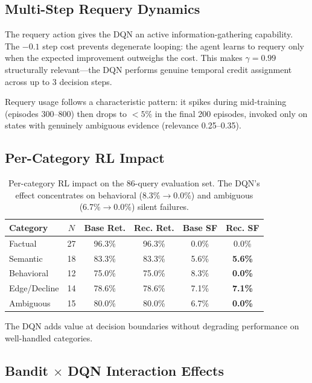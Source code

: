 \documentclass[11pt,letterpaper]{article}
\begin{document}
\subsection{Multi-Step Requery Dynamics}

The requery action gives the DQN an active information-gathering capability. The $-0.1$ step cost prevents degenerate looping: the agent learns to requery only when the expected improvement outweighs the cost. This makes $\gamma = 0.99$ structurally relevant---the DQN performs genuine temporal credit assignment across up to 3 decision steps.

Requery usage follows a characteristic pattern: it spikes during mid-training (episodes 300--800) then drops to $<5\%$ in the final 200 episodes, invoked only on states with genuinely ambiguous evidence (relevance 0.25--0.35).

\subsection{Per-Category RL Impact}

\begin{table}[H]
\centering
\small
\begin{tabular}{lccccc}
\toprule
\textbf{Category} & $N$ & \textbf{Base Ret.} & \textbf{Rec. Ret.} & \textbf{Base SF} & \textbf{Rec. SF} \\
\midrule
Factual & 27 & 96.3\% & 96.3\% & 0.0\% & 0.0\% \\
Semantic & 18 & 83.3\% & 83.3\% & 5.6\% & \textbf{5.6\%} \\
Behavioral & 12 & 75.0\% & 75.0\% & 8.3\% & \textbf{0.0\%} \\
Edge/Decline & 14 & 78.6\% & 78.6\% & 7.1\% & \textbf{7.1\%} \\
Ambiguous & 15 & 80.0\% & 80.0\% & 6.7\% & \textbf{0.0\%} \\
\bottomrule
\end{tabular}
\caption{Per-category RL impact on the 86-query evaluation set. The DQN's effect concentrates on behavioral (8.3\%$\to$0.0\%) and ambiguous (6.7\%$\to$0.0\%) silent failures.}
\label{tab:per-category-rl}
\end{table}

The DQN adds value at decision boundaries without degrading performance on well-handled categories.

\subsection{Bandit $\times$ DQN Interaction Effects}
\end{document}
